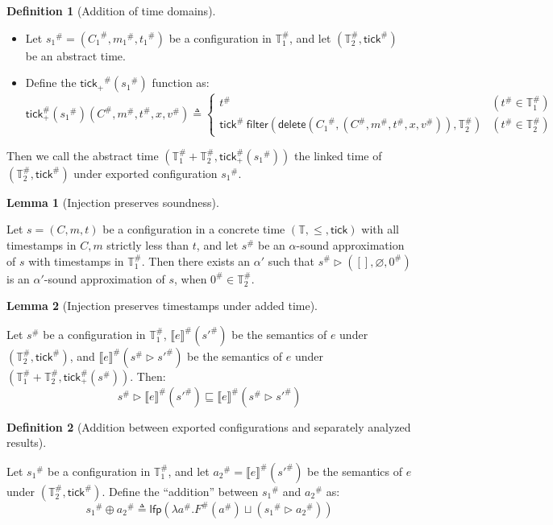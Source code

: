 \documentclass[acmsmall,screen]{acmart}
\theoremstyle{definition}
\newtheorem{definition}{Definition}[section]
\newtheorem{lem}{Lemma}[section]
\newcommand*{\A}[1]{{#1}^{\#}}
\newcommand*{\Time}{\mathbb{T}}
\newcommand*{\ATime}{\A{\Time}}
\newcommand*{\mem}{m}
\newcommand*{\sembracket}[1]{\lBrack{#1}\rBrack}
\newcommand*{\tick}{\mathsf{tick}}
\newcommand*{\delete}{\mathsf{delete}}
\newcommand*{\filter}{\mathsf{filter}}
\begin{document}
\begin{definition}[Addition of time domains]
  $\:$

  \begin{itemize}
    \item Let $\A{s_1}=(\A{C_1},\A{\mem_1},\A{t_1})$ be a configuration in $\ATime_1$, and let $(\ATime_2,\A{\tick})$ be an abstract time.
    \item Define the $\A{\tick_{+}}(\A{s_1})$ function as:
          \[
            \A\tick_{+}(\A{s_1})(\A{C},\A\mem,\A{t},x,\A{v})\triangleq
            \begin{cases}
              \A{t}                                                                      & (\A{t}\in\ATime_1) \\
              \A{\tick}\:\filter(\delete(\A{C_1},(\A{C},\A\mem,\A{t},x,\A{v})),\ATime_2) & (\A{t}\in\ATime_2)
            \end{cases}
          \]
  \end{itemize}

  Then we call the abstract time $(\ATime_1+\ATime_2,\A\tick_{+}(\A{s_1}))$ the linked time of $(\ATime_2,\A{\tick})$ under exported configuration $\A{s_1}$.
\end{definition}

\begin{lem}[Injection preserves soundness]
  $\:$

  Let $s=(C,\mem,t)$ be a configuration in a concrete time $(\Time,\le,\tick)$ with all timestamps in $C,\mem$ strictly less than $t$, and let $\A{s}$ be an $\alpha$-sound approximation of $s$ with timestamps in $\ATime_1$.
  Then there exists an $\alpha'$ such that $\A{s}\rhd([],\varnothing,\A{0})$ is an $\alpha'$-sound approximation of $s$, when $\A{0}\in\ATime_2$.
\end{lem}

\begin{lem}[Injection preserves timestamps under added time]
  $\:$

  Let $\A{s}$ be a configuration in $\ATime_1$, $\A{\sembracket{e}}(\A{s'})$ be the semantics of $e$ under $(\ATime_2,\A\tick)$, and $\A{\sembracket{e}}(\A{s}\rhd\A{s'})$ be the semantics of $e$ under $(\ATime_1+\ATime_2,\A\tick_{+}(\A{s}))$.
  Then:
  \[
    \A{s}\rhd\A{\sembracket{e}}(\A{s'})\sqsubseteq\A{\sembracket{e}}(\A{s}\rhd\A{s'})
  \]
\end{lem}

\begin{definition}[Addition between exported configurations and separately analyzed results]
  $\:$

  Let $\A{s_1}$ be a configuration in $\ATime_1$, and let $\A{a_2}=\A{\sembracket{e}}(\A{s'})$ be the semantics of $e$ under $(\ATime_2,\A\tick)$.
  Define the ``addition'' between $\A{s_1}$ and $\A{a_2}$ as:
  \[
    \A{s_1}\oplus\A{a_2}\triangleq\mathsf{lfp}(\lambda\A{a}.\A{F}(\A{a})\sqcup(\A{s_1}\rhd\A{a_2}))
  \]
\end{definition}
\end{document}
